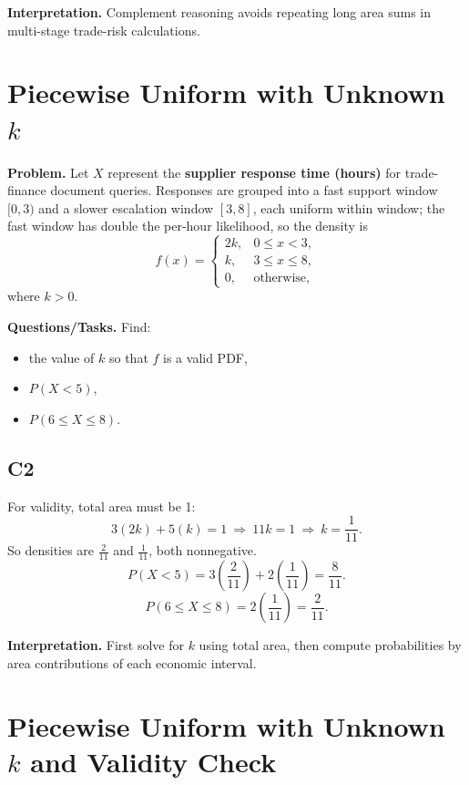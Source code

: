\textbf{Interpretation.}
Complement reasoning avoids repeating long area sums in multi-stage trade-risk calculations.

\section{Piecewise Uniform with Unknown $k$}

\textbf{Problem.}
Let $X$ represent the \textbf{supplier response time (hours)} for trade-finance document queries. Responses are grouped into a fast support window $[0,3)$ and a slower escalation window $[3,8]$, each uniform within window; the fast window has double the per-hour likelihood, so the density is
\[
f(x)=
\begin{cases}
2k, & 0\le x<3,\\
k, & 3\le x\le 8,\\
0, & \text{otherwise,}
\end{cases}
\]
where $k>0$.

\textbf{Questions/Tasks.}
Find:
\begin{itemize}
    \item[(a)] the value of $k$ so that $f$ is a valid PDF,
    \item[(b)] $P(X<5)$,
    \item[(c)] $P(6\le X\le 8)$.
\end{itemize}

\subsection*{C2}
For validity, total area must be 1:
\[
3(2k)+5(k)=1\ \Rightarrow\ 11k=1\ \Rightarrow\ k=\frac{1}{11}.
\]
So densities are $\frac{2}{11}$ and $\frac{1}{11}$, both nonnegative.
\[
P(X<5)=3\left(\frac{2}{11}\right)+2\left(\frac{1}{11}\right)=\frac{8}{11}.
\]
\[
P(6\le X\le 8)=2\left(\frac{1}{11}\right)=\frac{2}{11}.
\]

\textbf{Interpretation.}
First solve for $k$ using total area, then compute probabilities by area contributions of each economic interval.

\section{Piecewise Uniform with Unknown $k$ and Validity Check}

